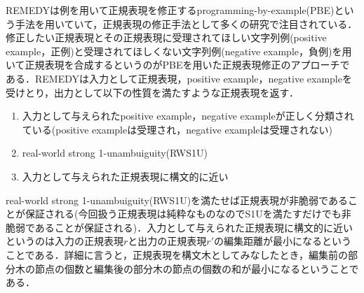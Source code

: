 \documentclass[a4paper, 12pt, dvipdfmx, uplatex]{jsreport}
\begin{document}
REMEDYは例を用いて正規表現を修正するprogramming-by-example(PBE)という手法を用いていて，正規表現の修正手法として多くの研究で注目されている．修正したい正規表現とその正規表現に受理されてほしい文字列例(positive example，正例)と受理されてほしくない文字列例(negative example，負例)を用いて正規表現を合成するというのがPBEを用いた正規表現修正のアプローチである．REMEDYは入力として正規表現，positive example，negative exampleを受けとり，出力として以下の性質を満たすような正規表現を返す．
\begin{enumerate}
  \item 入力として与えられたpositive example，negative exampleが正しく分類されている(positive exampleは受理され，negative exampleは受理されない)
  \item real-world strong 1-unambuiguity(RWS1U)
  \item 入力として与えられた正規表現に構文的に近い
\end{enumerate}
real-world strong 1-unambuiguity(RWS1U)を満たせば正規表現が非脆弱であることが保証される(今回扱う正規表現は純粋なものなのでS1Uを満たすだけでも非脆弱であることが保証される)．入力として与えられた正規表現に構文的に近いというのは入力の正規表現$r$と出力の正規表現$r'$の編集距離が最小になるということである．詳細に言うと，正規表現を構文木としてみなしたとき，編集前の部分木の節点の個数と編集後の部分木の節点の個数の和が最小になるということである．















\end{document}
